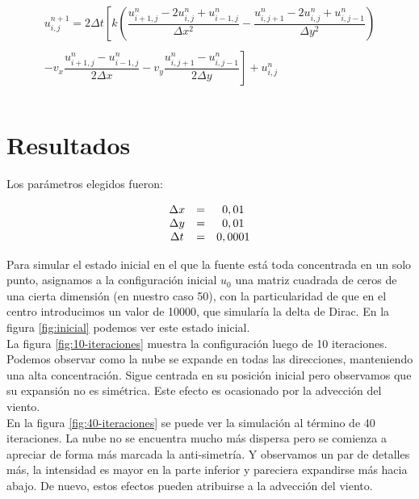 \documentclass[twocolumn,a4paper,10pt]{article}
\begin{document}
\begin{equation}
\label{ec:discretizacion-despejada}
\begin{array}{c}
u_{i,j}^{n+1} = 2\Delta t \left[ k \left( \dfrac{u_{i+1,j}^{n} - 2u_{i,j}^{n} + u_{i-1,j}^{n}}{\Delta x^2} - \dfrac{u_{i,j+1}^{n} - 2u_{i,j}^{n} + u_{i,j-1}^{n}}{\Delta y^2}  \right) \right.\\
     \\
 \left. - v_{x}\dfrac{u_{i+1,j}^{n} - u_{i-1,j}^{n}}{2\Delta x} -  v_{y}\dfrac{u_{i,j+1}^{n} - u_{i,j-1}^{n}}{2\Delta y} \right] + u_{i,j}^{n} \\
    \\
\end{array}       
\end{equation}

\section{Resultados}
\label{sec:resultados}

Los par\'ametros elegidos fueron:

\begin{equation}
    \nonumber
    \begin{array}{c c c}
        \Delta x & = & 0,01 \\
        \Delta y & = & 0,01 \\
        \Delta t & = & 0,0001 \\
    \end{array}
\end{equation}

Para simular el estado inicial en el que la fuente est\'a toda concentrada en un solo punto, asignamos a la configuraci\'on inicial $u_{0}$ una matriz 
cuadrada de ceros de una cierta dimensi\'on (en nuestro caso 50), con la particularidad de que en el centro introducimos un valor de 10000, que simular\'ia
la delta de Dirac. En la figura \ref{fig:inicial} podemos ver este estado inicial.\\

La figura \ref{fig:10-iteraciones} muestra la configuraci\'on luego de 10 iteraciones. Podemos observar como la nube se expande en todas las direcciones, 
manteniendo una alta concentraci\'on. Sigue centrada en su posici\'on inicial pero observamos que su expansi\'on no es sim\'etrica. Este efecto es ocasionado 
por la advecci\'on del viento. \\

En la figura \ref{fig:40-iteraciones} se puede ver la simulaci\'on al t\'ermino de 40 iteraciones. La nube no se encuentra mucho más dispersa pero se 
comienza a apreciar de forma m\'as marcada la anti-simetr\'ia. Y observamos un par de detalles m\'as, la intensidad es mayor en la parte inferior y pareciera
expandirse m\'as hacia abajo. De nuevo, estos efectos pueden atribuirse a la advecci\'on del viento.\\ 
\end{document}
